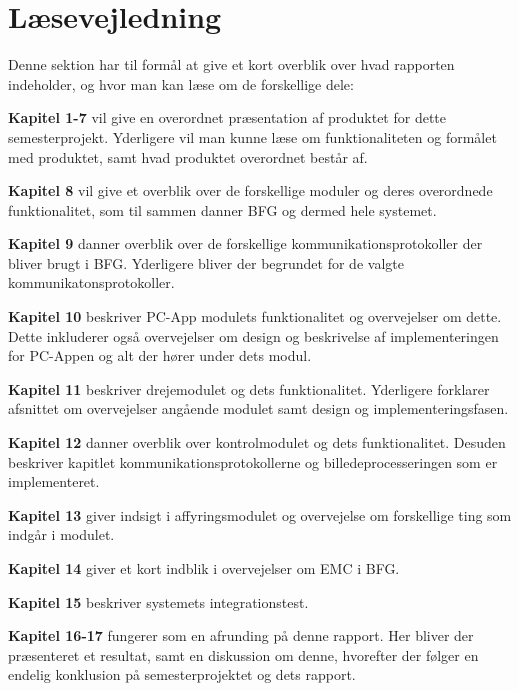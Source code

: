 \newpage






\section{Læsevejledning}

Denne sektion har til formål at give et kort overblik over hvad rapporten indeholder, og hvor man kan læse om de forskellige dele:

\textbf{Kapitel 1-7} vil give en overordnet præsentation af produktet for dette semesterprojekt. Yderligere vil man kunne læse om funktionaliteten og formålet med produktet, samt hvad produktet overordnet består af. 

\textbf{Kapitel 8} vil give et overblik over de forskellige moduler og deres overordnede funktionalitet, som til sammen danner BFG og dermed hele systemet.

\textbf{Kapitel 9} danner overblik over de forskellige kommunikationsprotokoller der bliver brugt i BFG. Yderligere bliver der begrundet for de valgte kommunikatonsprotokoller.

\textbf{Kapitel 10} beskriver PC-App modulets funktionalitet og overvejelser om dette. Dette inkluderer også overvejelser om design og beskrivelse af implementeringen for PC-Appen og alt der hører under dets modul.

\textbf{Kapitel 11} beskriver drejemodulet og dets funktionalitet. Yderligere forklarer afsnittet om overvejelser angående modulet samt design og implementeringsfasen. 

\textbf{Kapitel 12} danner overblik over kontrolmodulet og dets funktionalitet. Desuden beskriver kapitlet kommunikationsprotokollerne og billedeprocesseringen som er implementeret.

\textbf{Kapitel 13} giver indsigt i affyringsmodulet og overvejelse om forskellige ting som indgår i modulet. 

\textbf{Kapitel 14} giver et kort indblik i overvejelser om EMC i BFG.

\textbf{Kapitel 15} beskriver systemets integrationstest.

\textbf{Kapitel 16-17} fungerer som en afrunding på denne rapport. Her bliver der præsenteret et resultat, samt en diskussion om denne, hvorefter der følger en endelig konklusion på semesterprojektet og dets rapport.

